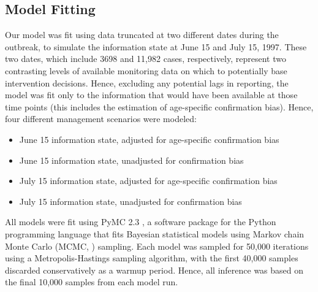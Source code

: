 \subsection{Model Fitting}\label{model-fitting}

Our model was fit using data truncated at two different dates during the
outbreak, to simulate the information state at June 15 and July 15,
1997. These two dates, which include 3698 and 11,982 cases,
respectively, represent two contrasting levels of available monitoring
data on which to potentially base intervention decisions. Hence,
excluding any potential lags in reporting, the model was fit only to the
information that would have been available at those time points (this
includes the estimation of age-specific confirmation bias). Hence, four
different management scenarios were modeled:

\begin{itemize}
\item June 15 information state, adjusted for age-specific confirmation bias
\item June 15 information state, unadjusted for confirmation bias
\item July 15 information state, adjusted for age-specific confirmation bias
\item July 15 information state, unadjusted for confirmation bias
\end{itemize}

All models were fit using PyMC 2.3 \cite{Patil_2010},
a software package for the Python programming language that fits
Bayesian statistical models using Markov chain Monte Carlo (MCMC, \citet{Geyer_2011}) sampling. Each model was sampled for 50,000
iterations using a Metropolis-Hastings sampling algorithm, with the
first 40,000 samples discarded conservatively as a warmup period. Hence,
all inference was based on the final 10,000 samples from each model run.